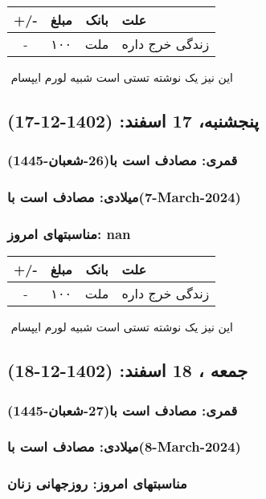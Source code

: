 \documentclass{article}
\newcommand{\rnote}[1]{\marginpar{\textcolor{color}{\StrSubstitute{\##1}{ }{\_}}}}
\newcommand{\myRow}[4]{
    #1 & #2 & #3 & #4 \\ \hline
}
\begin{document}
\begin{tabular}{ | c | c | c | p{5cm} |}
    \hline
    \myRow{ +/- }{مبلغ}{بانک}{علت}
    \myRow{-}{۱۰۰}{ملت}{زندگی خرج داره}
\end{tabular}
\newline
\newline

‌
\rnote{تست}
این نیز یک نوشته تستی است شبیه لورم ایپسام




\newpage
{}
\textcolor{color}{
\section{ پنجشنبه، 17 اسفند: (1402-12-17) }
\subsubsection*{قمری: مصادف است با(26-شعبان-1445)} 
\subsubsection*{میلادی: مصادف است با(7-March-2024)}
\subsubsection*{مناسبتهای امروز: nan}
}


\begin{tabular}{ | c | c | c | p{5cm} |}
    \hline
    \myRow{ +/- }{مبلغ}{بانک}{علت}
    \myRow{-}{۱۰۰}{ملت}{زندگی خرج داره}
\end{tabular}
\newline
\newline

‌
\rnote{تست}
این نیز یک نوشته تستی است شبیه لورم ایپسام




\newpage
{}
\textcolor{color}{
\section{ جمعه ، 18 اسفند: (1402-12-18) }
\subsubsection*{قمری: مصادف است با(27-شعبان-1445)} 
\subsubsection*{میلادی: مصادف است با(8-March-2024)}
\subsubsection*{مناسبتهای امروز: روزجهانی زنان}
}
\end{document}
